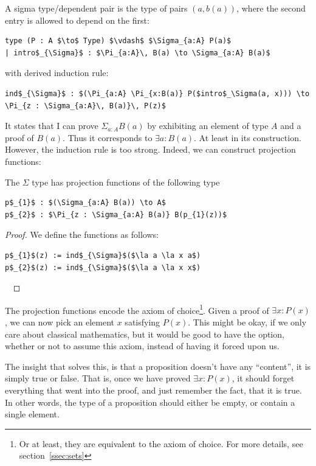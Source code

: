 \documentclass[a4paper, 12pt]{article}
\newcommand{\la}[1]{\lambda{#1}.\,}
\theoremstyle{changedot}
\theoremstyle{changedotbreak}
\theoremstyle{nonumberplain}
\newtheorem{proof}{Proof}
\begin{document}
\begin{definition}
  A sigma type/dependent pair is the type of pairs $(a, b(a))$, where the second entry is allowed to depend on the first:

\begin{lstlisting}
type (P : A $\to$ Type) $\vdash$ $\Sigma_{a:A} P(a)$
| intro$_{\Sigma}$ : $\Pi_{a:A}\, B(a) \to \Sigma_{a:A} B(a)$
\end{lstlisting}

  with derived induction rule:

\begin{lstlisting}
ind$_{\Sigma}$ : $(\Pi_{a:A} \Pi_{x:B(a)} P($intro$_\Sigma(a, x))) \to \Pi_{z : \Sigma_{a:A}\, B(a)}\, P(z)$
\end{lstlisting}
\end{definition}

It states that I can prove $\Sigma_{a:A}B(a)$ by exhibiting an element of type $A$ and a proof of $B(a)$. Thus it corresponds to $\exists a: B(a)$. At least in its construction. However, the induction rule is too strong. Indeed, we can construct projection functions:

\begin{theorem}
  The $\Sigma$ type has projection functions of the following type
\begin{lstlisting}
p$_{1}$ : $(\Sigma_{a:A} B(a)) \to A$
p$_{2}$ : $\Pi_{z : \Sigma_{a:A} B(a)} B(p_{1}(z))$
\end{lstlisting}
\end{theorem}
\begin{proof}
  We define the functions as follows:
\begin{lstlisting}
p$_{1}$(z) := ind$_{\Sigma}$($\la a \la x a$)
p$_{2}$(z) := ind$_{\Sigma}$($\la a \la x x$)
\end{lstlisting}
~
\end{proof}

The projection functions encode the axiom of choice\footnote{Or at least, they are equivalent to the axiom of choice. For more details, see section~\ref{ssec:sets}}. Given a proof of $\exists x: P(x)$, we can now pick an element $x$ satisfying $P(x)$. This might be okay, if we only care about classical mathematics, but it would be good to have the option, whether or not to assume this axiom, instead of having it forced upon us.

The insight that solves this, is that a proposition doesn't have any ``content'', it is simply true or false. That is, once we have proved $\exists x: P(x)$, it should forget everything that went into the proof, and just remember the fact, that it is true. In other words, the type of a proposition should either be empty, or contain a single element.
\end{document}
